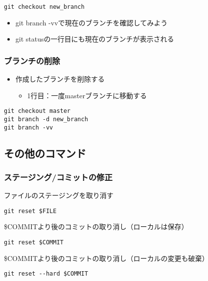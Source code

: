 \documentclass[a4paper,twoside,twocolumn]{bxjsarticle}
\begin{document}
\begin{verbatim}
git checkout new_branch
\end{verbatim}

\begin{itemize}
\item git branch -vvで現在のブランチを確認してみよう
\item git statusの一行目にも現在のブランチが表示される
\end{itemize}

\subsubsection{ブランチの削除}
\label{sec-1-6-6}

\begin{itemize}
\item 作成したブランチを削除する
\begin{itemize}
\item 1行目：一度masterブランチに移動する
\end{itemize}
\end{itemize}

\begin{verbatim}
git checkout master
git branch -d new_branch
git branch -vv
\end{verbatim}


\subsection{その他のコマンド}
\label{sec-1-7}
\subsubsection{ステージング/コミットの修正}
\label{sec-1-7-1}
ファイルのステージングを取り消す

\begin{verbatim}
git reset $FILE
\end{verbatim}

\$COMMITより後のコミットの取り消し（ローカルは保存）

\begin{verbatim}
git reset $COMMIT
\end{verbatim}

\$COMMITより後のコミットの取り消し（ローカルの変更も破棄）

\begin{verbatim}
git reset --hard $COMMIT
\end{verbatim}
\end{document}
